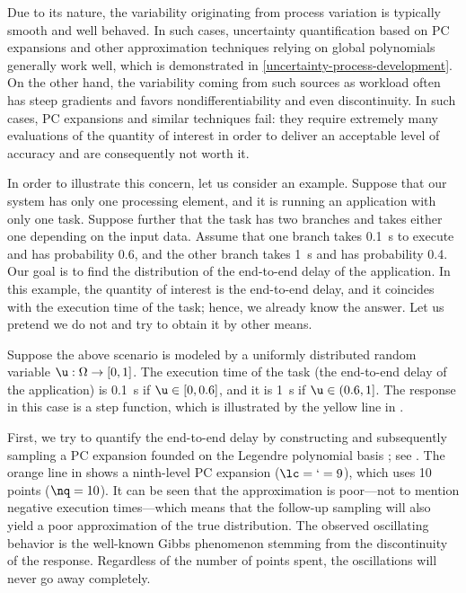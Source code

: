 Due to its nature, the variability originating from process variation is
typically smooth and well behaved. In such cases, uncertainty quantification
based on \ac{PC} expansions \cite{xiu2010} and other approximation techniques
relying on global polynomials generally work well, which is demonstrated in
\cref{uncertainty-process-development}. On the other hand, the variability
coming from such sources as workload often has steep gradients and favors
nondifferentiability and even discontinuity. In such cases, \ac{PC} expansions
and similar techniques fail: they require extremely many evaluations of the
quantity of interest in order to deliver an acceptable level of accuracy and are
consequently not worth it.

In order to illustrate this concern, let us consider an example. Suppose that
our system has only one processing element, and it is running an application
with only one task. Suppose further that the task has two branches and takes
either one depending on the input data. Assume that one branch takes 0.1~s to
execute and has probability 0.6, and the other branch takes 1~s and has
probability 0.4. Our goal is to find the distribution of the end-to-end delay of
the application. In this example, the quantity of interest is the end-to-end
delay, and it coincides with the execution time of the task; hence, we already
know the answer. Let us pretend we do not and try to obtain it by other means.

Suppose the above scenario is modeled by a uniformly distributed random variable
$\u: \Omega \to [0, 1]$. The execution time of the task (the end-to-end delay of
the application) is 0.1~s if $\u \in [0, 0.6]$, and it is 1~s if $\u \in (0.6,
1]$. The response in this case is a step function, which is illustrated by the
yellow line in .

First, we try to quantify the end-to-end delay by constructing and subsequently
sampling a \ac{PC} expansion founded on the Legendre polynomial basis
\cite{xiu2010}; see . The orange line in
 shows a ninth-level \ac{PC} expansion ($\lc = \lq = 9$),
which uses 10 points ($\nq = 10$). It can be seen that the approximation is
poor---not to mention negative execution times---which means that the follow-up
sampling will also yield a poor approximation of the true distribution. The
observed oscillating behavior is the well-known Gibbs phenomenon stemming from
the discontinuity of the response. Regardless of the number of points spent, the
oscillations will never go away completely.

